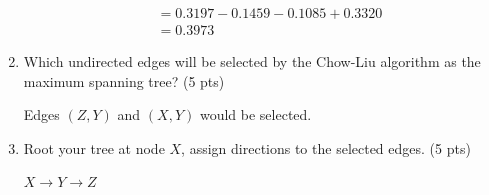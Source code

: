 \documentclass[a4paper]{article}
\theoremstyle{definition}
\newenvironment{soln}{
	\leavevmode\color{blue}\ignorespaces
}{}
\begin{document}
\begin{enumerate}
\begin{soln}
$$\begin{aligned}
			& = 0.3197 - 0.1459 - 0.1085 + 0.3320 \\
			& = 0.3973
		\end{aligned} $$
	\end{soln}
	\item Which undirected edges will be selected by the Chow-Liu algorithm as the maximum spanning tree? (5 pts) \\
	\begin{soln}
		Edges $(Z, Y)$ and $(X, Y)$ would be selected.
	\end{soln}
	\item Root your tree at node $X$, assign directions to the selected edges. (5 pts) \\
	\begin{soln}
		$X \rightarrow Y \rightarrow Z$
	\end{soln}
\end{enumerate}

	
	
\end{document}
